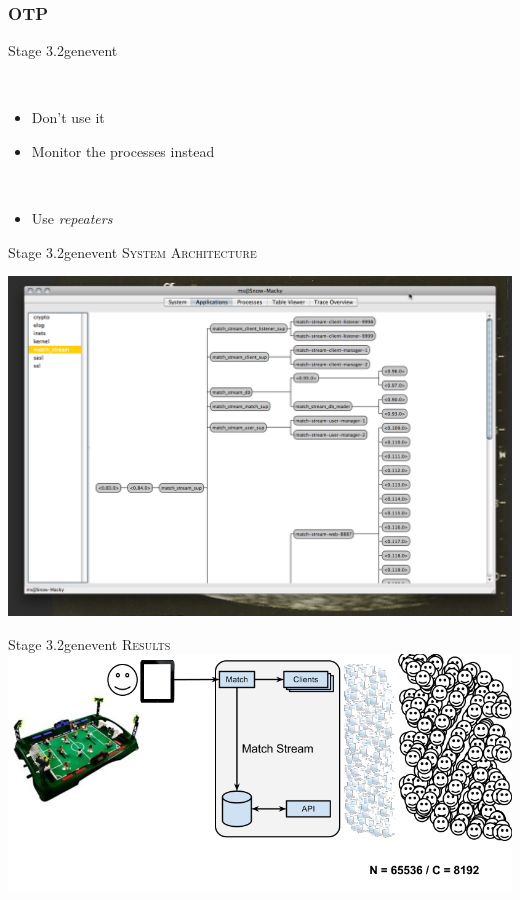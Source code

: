 \documentclass[utf8]{beamer}
\begin{document}
\subsubsection{OTP}
\begin{frame}{Stage 3.2}{gen\textunderscore event}
	\begin{description}
		\item<+->[sup\textunderscore handler]\ \\
			\begin{itemize}
				\item Don't use it
				\item Monitor the processes instead
			\end{itemize}
		\item<+->[Long Delivery Queues]\ \\
			\begin{itemize}
				\item Use \emph{repeaters}
			\end{itemize}
	\end{description}
\end{frame}
\begin{frame}{Stage 3.2}{gen\textunderscore event}
	\textsc{System Architecture}
	\begin{center}
		\includegraphics[height=.75\textheight]{img/running-late.png}
	\end{center}
\end{frame}
\begin{frame}{Stage 3.2}{gen\textunderscore event}
	\textsc{Results}
	\includegraphics[top=-1,width=\textwidth]{img/MatchStream-3.png}
\end{frame}
\end{document}
